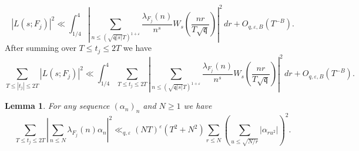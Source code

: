 \documentclass{article}
\newtheorem{lem}[thm]{Lemma}
\theoremstyle{named}
\newcommand{\q}{\mathfrak{q}}
\begin{document}
\begin{equation*}
    |L(s; F_j)|^2 \ll \int_{1/4}^{4}\left|\sum_{n \leq (\sqrt{\q|s|}T)^{1 + \varepsilon}} \frac{\lambda_{F_j}(n)}{n^s}W_s\left(\frac{nr}{T\sqrt{\q}}\right)\right|^2\, dr + O_{q, \varepsilon, B}(T^{-B}).
\end{equation*}
After summing over $T \leq t_j \leq 2T$ we have
\begin{equation}\label{eq:truncatedapproximatefunctionalinequality}
    \sum_{T \leq |t_j| \leq 2T}  |L(s; F_j)|^2 \ll  \int_{1/4}^{4}  \sum_{T \leq t_j \leq 2T} \left|\sum_{n \leq (\sqrt{\q|s|}T)^{1 + \varepsilon}} \frac{\lambda_{F_j}(n)}{n^s}W_s\left(\frac{nr}{T\sqrt{\q}}\right)\right|^2 \, dr + O_{q, \varepsilon, B}(T^{-B}).
\end{equation}

\begin{lem}\label{lem:largesieveadjoint}
For any sequence $(\alpha_n)_n$ and $N \geq 1$ we have 
\begin{equation}\label{eq:largesieveadjoint}
    \sum_{T \leq t_j \leq 2T} \left|\sum_{n \leq N} \lambda_{F_j}(n)\alpha_n\right|^2\ll_{q, \varepsilon} (NT)^\varepsilon(T^2 + N^2)\sum_{r \leq N}\left(\sum_{u \leq \sqrt{N/r}} |\alpha_{ru^2}|\right)^2. 
\end{equation} 
\end{lem}
\end{document}

